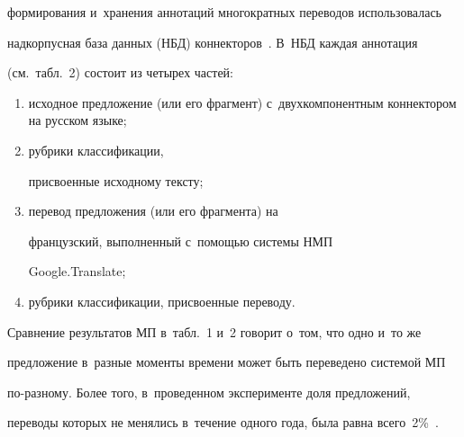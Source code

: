 формирования и~хранения аннотаций многократных переводов использовалась 


надкорпусная база данных (НБД) коннекторов~\cite{18-eg, 19-eg, 20-eg}. В~НБД каждая аннотация 


(см.\ табл.~2) состоит из четырех частей: 


\begin{enumerate}[(1)]


\item исходное предложение (или его фрагмент) с~двухкомпонентным коннектором на русском языке;


\item рубрики классификации, 


присвоенные исходному тексту; 


\item перевод предложения (или его фрагмента) на 


французский, выполненный с~по\-мощью сис\-те\-мы НМП 


Google.Translate; 


\item руб\-ри\-ки классификации, присвоенные переводу. 


\end{enumerate}





Сравнение результатов МП в~табл.~1 и~2 говорит о~том, что одно и~то же 


предложение в~разные моменты времени может быть переведено системой МП  


по-раз\-но\-му. Более того, в~проведенном эксперименте доля предложений, 


переводы которых не менялись в~течение одного года, была равна всего~2\%~\cite{16-eg}.


  


